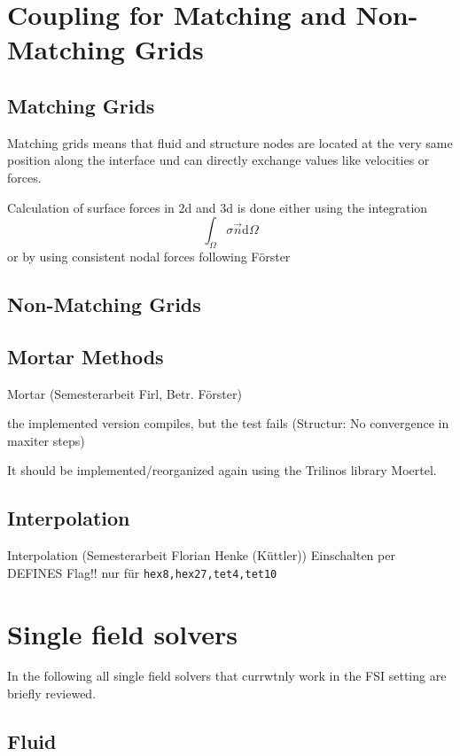 \section{Coupling for Matching and Non-Matching Grids}

\subsection{Matching Grids}
Matching grids means that fluid and structure nodes are located at the very same position along the interface und can directly exchange values like velocities or forces.

Calculation of surface forces in 2d and 3d is done either using the integration
\begin{equation}
\int_\Omega \sigma \vec{n} \mathrm{d}\Omega
\end{equation}
or by using consistent nodal forces following F\"orster


\subsection{Non-Matching Grids}

\subsection{Mortar Methods}
Mortar (Semesterarbeit Firl, Betr. F\"orster)

the implemented version compiles, but the test fails (Structur: No convergence in maxiter steps)


It should be implemented/reorganized again using the Trilinos library Moertel.

\subsection{Interpolation}
Interpolation (Semesterarbeit Florian Henke (K\"uttler))
Einschalten per DEFINES Flag!!
nur f\"ur \verb|hex8,hex27,tet4,tet10|





\section{Single field solvers}

In the following all single field solvers that currwtnly work in the FSI setting are briefly reviewed.

\subsection{Fluid}

